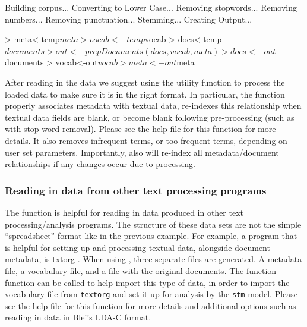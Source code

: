 \documentclass[nojss]{jss}
\begin{document}
\begin{Schunk}
\begin{Soutput}
Building corpus... 
Converting to Lower Case... 
Removing stopwords... 
Removing numbers... 
Removing punctuation... 
Stemming... 
Creating Output... 
\end{Soutput}
\begin{Sinput}
> meta<-temp$meta
> vocab<-temp$vocab
> docs<-temp$documents
> out <- prepDocuments(docs, vocab, meta)
> docs<-out$documents
> vocab<-out$vocab
> meta <-out$meta
\end{Sinput}
\end{Schunk}

After reading in the data we suggest using the utility function  to process the loaded data to make sure it is in the right format. In particular, the  function properly associates metadata with textual data, re-indexes this relationship when textual data fields are blank, or become blank following pre-processing (such as with stop word removal). Please see the help file for this function for more details. It also removes infrequent terms, or too frequent terms, depending on user set parameters. Importantly, also will re-index all metadata/document relationships if any changes occur due to processing.

\subsubsection{Reading in data from other text processing programs}

The  function is helpful for reading in data produced in other text processing/analysis programs. The structure of these data sets are not the simple ``spreadsheet'' format like in the previous example.
For example, a program that is helpful for setting up and processing textual data, alongside document metadata, is \href{www.txtorg.org}{txtorg} \citep{TextComparative}. When using , three separate files are generated. A metadata file, a vocabulary file, and a file with the original documents. The function  function can be called to help import this type of data, in order to import the vocabulary file from \texttt{textorg} and set it up for analysis by the \texttt{stm} model. Please see the help file for this function for more details and additional options such as reading in data in Blei's LDA-C format.
\end{document}
